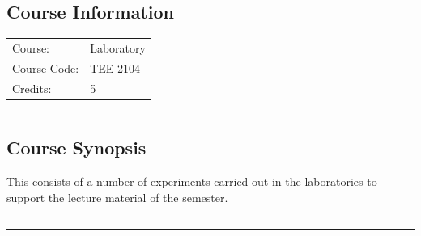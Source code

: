 
\subsection*{Course Information}
\vspace{0ex}%
\noindent\parbox{0.5\textwidth}{%
    \noindent\begin{tabular}{@{}ll}
                 \textsf{Course:}          & 	 Laboratory \\
                 \textsf{Course Code:}         & 	TEE 2104 \\
                 \textsf{Credits:}    & 	5
    \end{tabular}}
\vspace{2ex}\hrule\vspace{2ex}


\subsection*{Course Synopsis}
This consists of a number of experiments carried out in the laboratories to support the lecture material of the semester.
\vspace{2ex}\hrule
\vspace{2ex}\hrule\vspace{2ex}